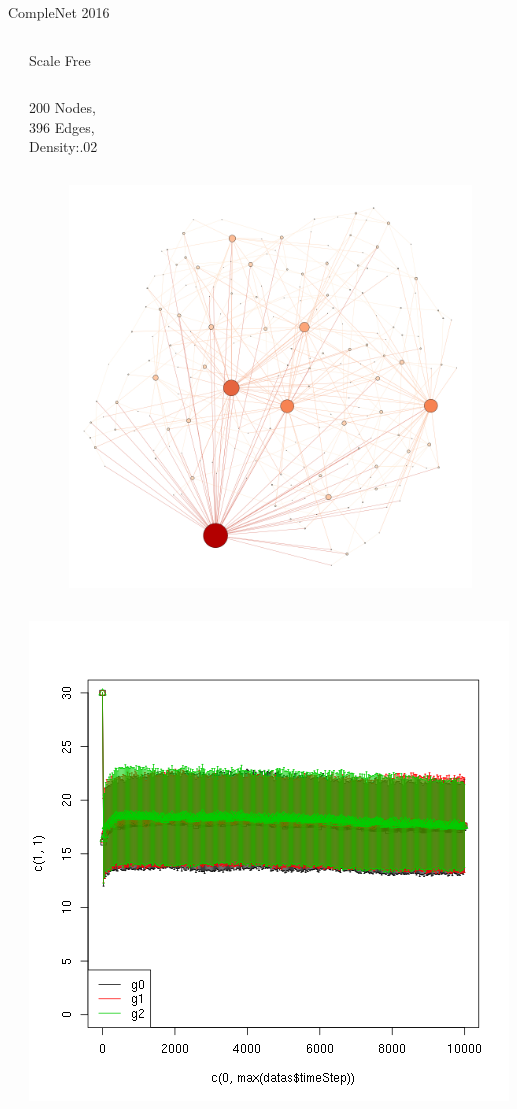 \documentclass[9pt, handout=show,notes=show]{beamer}
\begin{document}
\begin{frame}{CompleNet 2016}
\begin{center}
\begin{columns}
\begin{column}{.5\textwidth}
\begin{center}
		\end{center}
	    \end{column}
	    \begin{column}{.5\textwidth}
		\begin{center}
		    Scale Free
		\end{center}
		\begin{column}{.2\textwidth}
			\tiny
			200 Nodes,\\
			396 Edges,\\
			Density:.02
		\end{column}
		\begin{column}{.8\textwidth}
		    \begin{figure}
			\includegraphics[width=\textwidth]{images/graphSF.png}
		    \end{figure}
		\end{column}
		\begin{center}
		    \includegraphics[width=.6\textwidth]{images/scoreSF.png}
		\end{center}


\end{column}
\end{columns}
\end{center}
\end{frame}
\end{document}

